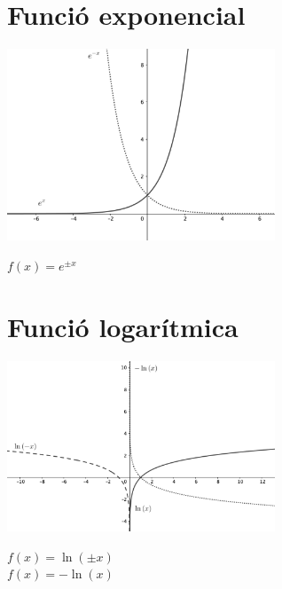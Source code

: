 \documentclass{article}
\begin{document}
\section{Funció exponencial}
\begin{minipage}{0.5\textwidth}
	\includegraphics[width=0.6\textwidth]{funcio_exp.png}
\end{minipage}
\begin{minipage}{0.5\textwidth}
	\vspace{0.5 cm}
	$f(x)=e^{\pm x}$\\
\end{minipage}

\section{Funció logarítmica}
\begin{minipage}{0.5\textwidth}
	\includegraphics[width=0.6\textwidth]{funcio_ln.png}
\end{minipage}
\begin{minipage}{0.5\textwidth}
	\vspace{0.5 cm}
	$f(x)=\ln (\pm x)$\\
	$f(x)=-\ln (x)$\\
\end{minipage}
\end{document}
